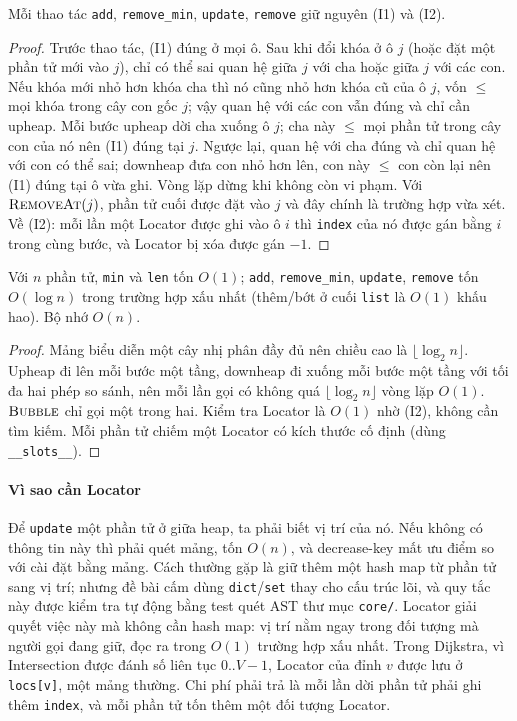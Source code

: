 \begin{lemma}\label{lem:apq-inv}
Mỗi thao tác \texttt{add}, \texttt{remove\_min}, \texttt{update}, \texttt{remove} giữ nguyên (I1) và (I2).
\end{lemma}
\begin{proof}
Trước thao tác, (I1) đúng ở mọi ô. Sau khi đổi khóa ở ô $j$ (hoặc đặt một phần tử mới vào $j$), chỉ có thể sai quan hệ giữa $j$ với cha hoặc giữa $j$ với các con. Nếu khóa mới nhỏ hơn khóa cha thì nó cũng nhỏ hơn khóa cũ của ô $j$, vốn $\le$ mọi khóa trong cây con gốc $j$; vậy quan hệ với các con vẫn đúng và chỉ cần upheap. Mỗi bước upheap dời cha xuống ô $j$; cha này $\le$ mọi phần tử trong cây con của nó nên (I1) đúng tại $j$. Ngược lại, quan hệ với cha đúng và chỉ quan hệ với con có thể sai; downheap đưa con nhỏ hơn lên, con này $\le$ con còn lại nên (I1) đúng tại ô vừa ghi. Vòng lặp dừng khi không còn vi phạm. Với $\textsc{RemoveAt}(j)$, phần tử cuối được đặt vào $j$ và đây chính là trường hợp vừa xét. Về (I2): mỗi lần một Locator được ghi vào ô $i$ thì \texttt{index} của nó được gán bằng $i$ trong cùng bước, và Locator bị xóa được gán $-1$.
\end{proof}

\begin{theorem}\label{thm:apq-cost}
Với $n$ phần tử, \texttt{min} và \texttt{len} tốn $O(1)$; \texttt{add}, \texttt{remove\_min}, \texttt{update}, \texttt{remove} tốn $O(\log n)$ trong trường hợp xấu nhất (thêm/bớt ở cuối \texttt{list} là $O(1)$ khấu hao). Bộ nhớ $O(n)$.
\end{theorem}
\begin{proof}
Mảng biểu diễn một cây nhị phân đầy đủ nên chiều cao là $\lfloor \log_2 n \rfloor$. Upheap đi lên mỗi bước một tầng, downheap đi xuống mỗi bước một tầng với tối đa hai phép so sánh, nên mỗi lần gọi có không quá $\lfloor \log_2 n \rfloor$ vòng lặp $O(1)$. $\textsc{Bubble}$ chỉ gọi một trong hai. Kiểm tra Locator là $O(1)$ nhờ (I2), không cần tìm kiếm. Mỗi phần tử chiếm một Locator có kích thước cố định (dùng \texttt{\_\_slots\_\_}).
\end{proof}

\paragraph{Vì sao cần Locator}
Để \texttt{update} một phần tử ở giữa heap, ta phải biết vị trí của nó. Nếu không có thông tin này thì phải quét mảng, tốn $O(n)$, và decrease-key mất ưu điểm so với cài đặt bằng mảng. Cách thường gặp là giữ thêm một hash map từ phần tử sang vị trí; nhưng đề bài cấm dùng \texttt{dict}/\texttt{set} thay cho cấu trúc lõi, và quy tắc này được kiểm tra tự động bằng test quét AST thư mục \texttt{core/}. Locator giải quyết việc này mà không cần hash map: vị trí nằm ngay trong đối tượng mà người gọi đang giữ, đọc ra trong $O(1)$ trường hợp xấu nhất. Trong Dijkstra, vì Intersection được đánh số liên tục $0..V-1$, Locator của đỉnh $v$ được lưu ở \texttt{locs[v]}, một mảng thường. Chi phí phải trả là mỗi lần dời phần tử phải ghi thêm \texttt{index}, và mỗi phần tử tốn thêm một đối tượng Locator.

